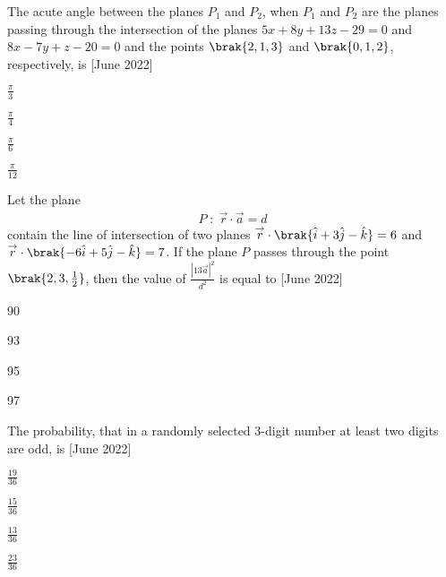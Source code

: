 \iffalse
\title{2022}
\author{EE24BTECH11063}
\section{mcq-single}
\fi
\item The acute angle between the planes $P_1$ and $P_2$, when $P_1$ and $P_2$ are the planes passing through the intersection of the planes $5x+8y+13z-29=0$ and $8x-7y+z-20=0$ and the points $\brak{2,1,3}$ and $\brak{0,1,2}$, respectively, is \hfill{[June 2022]}
    \begin{enumerate}
    \begin{multicols}{4}
    \item $\frac{\pi}{3}$
    \item $\frac{\pi}{4}$
    \item $\frac{\pi}{6}$
    \item $\frac{\pi}{12}$
    \end{multicols}
        \end{enumerate}
        \bigskip
        \item Let the plane 
        \begin{align*}
        P\;:\;\overset{\rightarrow}{r}\cdot\overset{\rightarrow}{a}=d
        \end{align*}
        contain the line of intersection of two planes $\overset{\rightarrow}{r}\cdot \brak{\hat{i}+3\hat{j}-\hat{k}}=6$ and $\overset{\rightarrow}{r}\cdot \brak{-6\hat{i}+5\hat{j}-\hat{k}}=7$. If the plane $P$ passes through the point $\brak{2,3,\frac{1}{2}}$, then the value of $\frac{|13\overset{\rightarrow}{a}|^2}{d^2}$ is equal to \hfill{[June 2022]}
        \begin{enumerate}
        \begin{multicols}{4}
            \item 90
            \item 93
            \item 95
            \item 97
            \end{multicols}
        \end{enumerate}
        \bigskip
\item The probability, that in a randomly selected 3-digit number at least two digits are odd, is \hfill{[June 2022]}
        \begin{enumerate}
        \begin{multicols}{4}
        \item $\frac{19}{36}$
        \item $\frac{15}{36}$
        \item $\frac{13}{36}$
        \item $\frac{23}{36}$
        \end{multicols}
        \end{enumerate}
